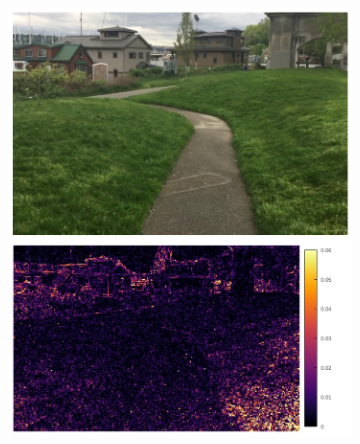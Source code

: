 \documentclass{article}
\begin{document}
\begin{figure}
\begin{subfigure}{0.25\textwidth}
\end{subfigure}%
\begin{subfigure}{0.25\textwidth}
	\centering
    \includegraphics[width=1\linewidth]{qua_imgs/720p_240fps_1_abme.jpg}


\end{subfigure}
\end{figure}
\end{document}
